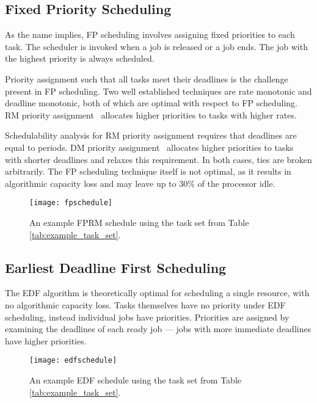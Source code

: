 \subsection{Fixed Priority Scheduling}
As the name implies, \gls{FP} scheduling involves assigning fixed priorities to each task.
The scheduler is invoked when a job is released or a job ends.
The job with the highest priority is always scheduled.

Priority assignment such that all tasks meet their deadlines is the challenge present in \gls{FP} scheduling.
Two well established techniques are rate monotonic and deadline monotonic, both of which are optimal with respect to \gls{FP} scheduling.
\Gls{RM} priority assignment~\citep{Liu_Layland_73} allocates higher priorities to tasks with higher rates.

Schedulability analysis for \gls{RM} priority assignment requires that deadlines are equal to periods.
\Gls{DM} priority assignment~\citep{Leung_Whitehead_1982} allocates higher priorities to tasks with shorter deadlines and relaxes this requirement.
In both cases, ties are broken arbitrarily.
The \gls{FP} scheduling technique itself is not optimal, as it results in algorithmic capacity loss and may leave up to 30\% of the processor idle.

\begin{figure}[h!tb]
	\begin{center}
		\leavevmode
		\texttt{[image: fpschedule]}
		\caption{An example FPRM schedule using the task set from Table \ref{tab:example_task_set}.}
		\label{fig:fp-schedule}
	\end{center}
\end{figure}

\subsection{Earliest Deadline First Scheduling}

The \gls{EDF} algorithm is theoretically optimal for scheduling a single resource, with no algorithmic capacity loss.
Tasks themselves have no priority under \gls{EDF} scheduling, instead individual jobs have priorities.
Priorities are assigned by examining the deadlines of each ready job --- jobs with more immediate deadlines have higher priorities.

\begin{figure}[h!tb]
	\begin{center}
		\leavevmode
		\texttt{[image: edfschedule]}
		\caption{An example EDF schedule using the task set from Table \ref{tab:example_task_set}.}
		\label{fig:edf-schedule}
	\end{center}
\end{figure}

